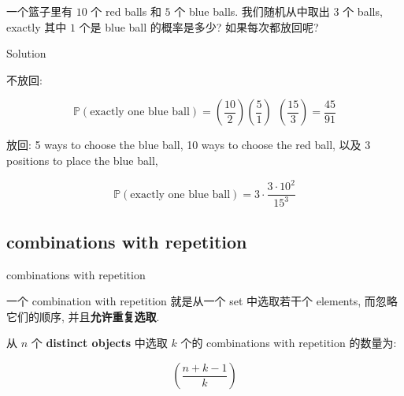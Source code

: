 \documentclass{qlnotes-export}
\begin{document}
\begin{example}\label{ex-01-combinatorics-prob-space-example-004}

一个篮子里有 \(10\) 个 red balls 和 \(5\) 个 blue balls. 我们随机从中取出 \(3\) 个 balls, exactly 其中 \(1\) 个是 blue ball 的概率是多少? 如果每次都放回呢?

\end{example}

\begin{qlsolution}{Solution}

不放回:

\[{\mathbb{P}}(\text{exactly one blue ball}) = \left( \frac{10}{2} \right)\left( \frac{5}{1} \right)\ \ \left( \frac{15}{3} \right) = \frac{45}{91}\]

放回: 5 ways to choose the blue ball, 10 ways to choose the red ball, 以及 3 positions to place the blue ball,

\[{\mathbb{P}}(\text{exactly one blue ball}) = 3 \cdot \frac{3 \cdot 10^{2}}{15^{3}}\]

\end{qlsolution}

\subsection{combinations with repetition}\label{combinations-with-repetition}

\begin{definition}{combinations with repetition}\label{def-01-combinatorics-prob-space-combinations-with-repetition}

一个 combination with repetition 就是从一个 set 中选取若干个 elements, 而忽略它们的顺序, 并且\textbf{允许重复选取}.

\end{definition}

\begin{proposition}\label{prop-01-combinatorics-prob-space-proposition-004}

从 \(n\) 个 \textbf{distinct objects} 中选取 \(k\) 个的 combinations with repetition 的数量为:

\[\left( \frac{n + k - 1}{k} \right)\]

\end{proposition}
\end{document}
